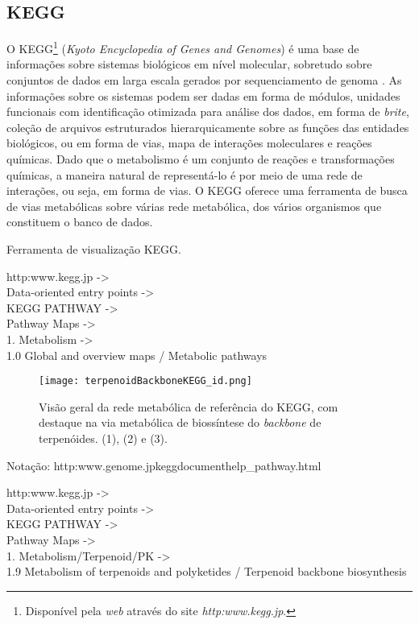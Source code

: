 
\subsection{KEGG}

\indent O KEGG\footnote{Disponível pela \textit{web} através do site \textit{http:\/\/www.kegg.jp\/}.} (\textit{Kyoto Encyclopedia of Genes and Genomes}) é uma base de informações sobre sistemas biológicos em nível molecular, sobretudo sobre conjuntos de dados em larga escala gerados por sequenciamento de genoma \cite{keggOverview}. As informações sobre os sistemas podem ser dadas em forma de módulos, unidades funcionais com identificação otimizada para análise dos dados, em forma de \textit{brite}, coleção de arquivos estruturados hierarquicamente sobre as funções das entidades biológicos, ou em forma de vias, mapa de interações moleculares e reações químicas. Dado que o metabolismo é um conjunto de reações e transformações químicas, a maneira natural de representá-lo é por meio de uma rede de interações, ou seja, em forma de vias. O KEGG oferece uma ferramenta de busca de vias metabólicas sobre várias rede metabólica, dos vários organismos que constituem o banco de dados.

\indent Ferramenta de visualização KEGG. 

http:\/\/www.kegg.jp\/ -> \\ Data-oriented entry points  -> \\KEGG PATHWAY ->\\ Pathway Maps -> \\1. Metabolism  -> \\1.0 Global and overview maps / Metabolic pathways

\begin{figure}[h]
\centering
\texttt{[image: terpenoidBackboneKEGG\_id.png]}
\caption{Visão geral da rede metabólica de referência do KEGG, com destaque na via metabólica de biossíntese do \textit{backbone} de terpenóides. (1), (2) e (3).}
\label{terpenoidBackboneKEGG}
\end{figure}

Notação: http:\/\/www.genome.jp\/kegg\/document\/help\_pathway.html

http:\/\/www.kegg.jp\/ -> \\ Data-oriented entry points  -> \\KEGG PATHWAY ->\\ Pathway Maps -> \\1. Metabolism/Terpenoid/PK   -> \\1.9 Metabolism of terpenoids and polyketides / Terpenoid backbone biosynthesis

